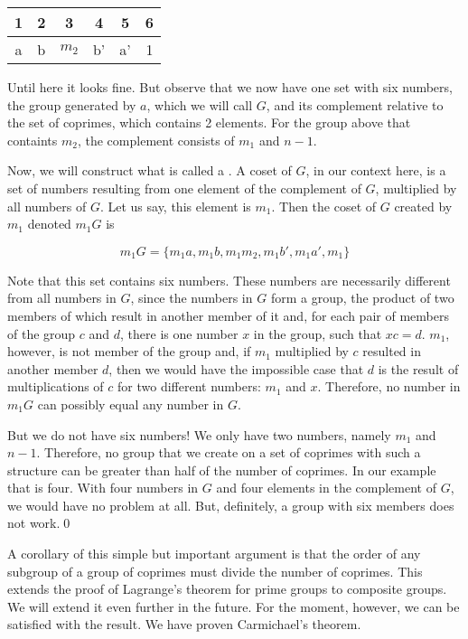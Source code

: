 \documentclass[tikz]{scrreprt}
\begin{document}
\begin{center}
\begin{tabular}{|c|c|c|c|c|c}
 1 &  2 &  3   &  4 &  5 &  6 \\\hline
 a &  b & $m_2$& b' & a' &  1 
\end{tabular}
\end{center}

Until here it looks fine.
But observe that we now have one set with six numbers,
the group generated by $a$, which we will call $G$,
and its complement relative to the set of coprimes,
which contains 2 elements. For the group above
that containts $m_2$, the complement 
consists of $m_1$ and $n-1$.

Now, we will construct what is called a .
A coset of $G$, in our context here, is a set of numbers
resulting from one element of the
complement of $G$, multiplied by all numbers of $G$.
Let us say, this element is $m_1$. Then the coset
of $G$ created by $m_1$ denoted $m_1G$ is

\begin{equation}
m_1G = \lbrace m_1a, m_1b, m_1m_2, m_1b', m_1a', m_1\rbrace
\end{equation}

Note that this set contains six numbers.
These numbers are necessarily different from
all numbers in $G$, since the numbers in $G$
form a group, the product of two members of which
result in another member of it and,
for each pair of members of the group $c$ and $d$, 
there is one number $x$ in the group, such that
$xc = d$.
$m_1$, however, is not member of the group
and, if $m_1$ multiplied by $c$
resulted in another member $d$, then we would
have the impossible case that $d$ is the result 
of multiplications of $c$ for 
two different numbers: $m_1$ and $x$.
Therefore, no number in $m_1G$ can possibly equal
any number in $G$.

But we do not have six numbers!
We only have two numbers, namely $m_1$ 
and $n-1$.
Therefore, no group that we create on a
set of coprimes with such a structure
can be greater than half of the number of coprimes.
In our example that is four. With four numbers
in $G$ and four elements in the complement of
$G$, we would have no problem at all.
But, definitely, a group with six members does 
not work.\qed

A corollary of this 
simple but important argument is that
the order of any subgroup of a group of
coprimes must divide the number of coprimes.
This extends
the proof of Lagrange's theorem for prime groups
to composite groups. We will extend it even further
in the future. For the moment, however,
we can be satisfied with the result.
We have proven Carmichael's theorem.
\end{document}
